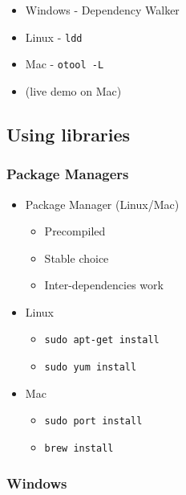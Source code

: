 \begin{itemize}
\itemsep1pt\parskip0pt
\item
  Windows - Dependency Walker
\item
  Linux - \texttt{ldd}
\item
  Mac - \texttt{otool -L}
\item
  (live demo on Mac)
\end{itemize}

\subsection{Using libraries}\label{using-libraries}

\subsubsection{Package Managers}\label{package-managers}

\begin{itemize}
\itemsep1pt\parskip0pt
\item
  Package Manager (Linux/Mac)

  \begin{itemize}
  \itemsep1pt\parskip0pt
  \item
    Precompiled
  \item
    Stable choice
  \item
    Inter-dependencies work
  \end{itemize}
\item
  Linux

  \begin{itemize}
  \itemsep1pt\parskip0pt
  \item
    \texttt{sudo apt-get install}
  \item
    \texttt{sudo yum install}
  \end{itemize}
\item
  Mac

  \begin{itemize}
  \itemsep1pt\parskip0pt
  \item
    \texttt{sudo port install}
  \item
    \texttt{brew install}
  \end{itemize}
\end{itemize}

\subsubsection{Windows}\label{windows}


